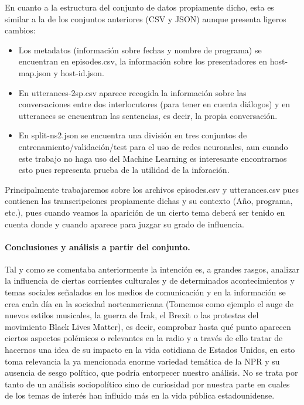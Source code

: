 \documentclass[11pt, a4paper]{article} %
\begin{document}
En cuanto a la estructura del conjunto de datos propiamente dicho, esta es similar a la de los conjuntos anteriores (CSV y JSON) aunque presenta ligeros cambios: 
\begin{itemize}
\item Los metadatos (información sobre fechas y nombre de programa) se encuentran en episodes.csv, la información sobre los presentadores en host-map.json y host-id.json.
\item En utterances-2sp.csv aparece recogida la información sobre las conversaciones entre dos interlocutores (para tener en cuenta diálogos) y en utterances se encuentran las sentencias, es decir, la propia conversación. 
\item En split-ns2.json se encuentra una división en tres conjuntos de entrenamiento/validación/test para el uso de redes neuronales, aun cuando este trabajo no haga uso del Machine Learning es interesante encontrarnos esto pues representa prueba de la utilidad de la inforación.
\end{itemize}


Principalmente trabajaremos sobre los archivos episodes.csv y utterances.csv pues contienen las transcripciones propiamente dichas y su contexto (Año, programa, etc.), pues cuando veamos la aparición de un cierto tema deberá ser tenido en cuenta donde y cuando aparece para juzgar su grado de influencia.
\paragraph{Conclusiones y análisis a partir del conjunto.}
Tal y como se comentaba anteriormente la intención es, a grandes rasgos, analizar la influencia de ciertas corrientes culturales y de determinados acontecimientos y temas sociales señalados en los medios de comunicación y en la información se crea cada día en la sociedad norteamericana (Tomemos como ejemplo el auge de nuevos estilos musicales, la guerra de Irak, el Brexit o las protestas del movimiento Black Lives Matter), es decir, comprobar hasta qué punto aparecen ciertos aspectos polémicos o relevantes en la radio y a través de ello tratar de hacernos una idea de su impacto en la vida cotidiana de Estados Unidos, en esto toma relevancia la ya mencionada enorme variedad temática de la NPR y su ausencia de sesgo político, que podría entorpecer nuestro análisis. No se trata por tanto de un análisis sociopolítico sino de curiosidad por nuestra parte en cuales de los temas de interés han influido más en la vida pública estadounidense.
\end{document}
